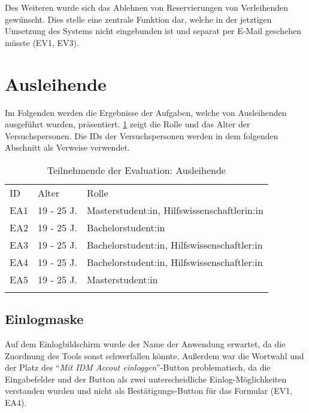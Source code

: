 Des Weiteren wurde sich das Ablehnen von Reservierungen von Verleihenden gewünscht. Dies stelle
eine zentrale Funktion dar, welche in der jetztigen Umsetzung des Systems nicht eingebunden ist und
separat per E-Mail geschehen müsste (EV1, EV3).

\section{Ausleihende}
Im Folgenden werden die Ergebnisse der Aufgaben, welche von Ausleihenden ausgeführt wurden,
präsentiert. \ref{table:azwei} zeigt die Rolle und das Alter der Versuchspersonen. Die IDs der
Versuchspersonen werden in dem folgenden Abschnitt als Verweise verwendet.

\begin{table}[h]
  \centering
  \caption{Teilnehmende der Evaluation: Ausleihende}
  \begin{tabular}{lll}
    \arrayrulecolor{maincolor}\hline
    \sffamily\color{maincolor}ID & \sffamily\color{maincolor}Alter &
    \sffamily\color{maincolor}Rolle                                  \\
    \arrayrulecolor{maincolor}\hline
    EA1                         & 19 - 25 J.                      &
    Masterstudent:in, Hilfswissenschaftlerin:in                      \\
    EA2                         & 19 - 25 J.                      &
    Bachelorstudent:in                                               \\
    EA3                         & 19 - 25 J.                      &
    Bachelorstudent:in, Hilfswissenschaftler:in                      \\
    EA4                         & 19 - 25 J.                      &
    Bachelorstudent:in, Hilfswissenschaftler:in                      \\
    EA5                         & 19 - 25 J.                      &
    Masterstudent:in                                                 \\
    \arrayrulecolor{maincolor}\hline
  \end{tabular}
  \label{table:azwei}
\end{table}

\subsection{Einlogmaske}
Auf dem Einlogbildschirm wurde der Name der Anwendung erwartet, da die
Zuordnung des Tools sonst schwerfallen könnte. Außerdem war die Wortwahl und der
Platz des \enquote{\textit{Mit IDM Accout einloggen}}-Button problematisch, da die
Eingabefelder und der Button als zwei unterscheidliche Einlog-Möglichkeiten verstanden
wurden und nicht als Bestätigungs-Button für das Formular (EV1, EA4).

